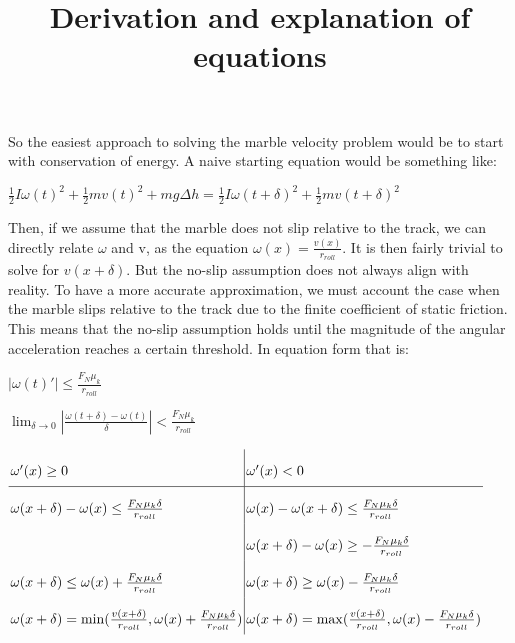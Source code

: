 \documentclass{article}
\begin{document}
\title{Derivation and explanation of equations}
\maketitle

So the easiest approach to solving the marble velocity problem would be
to start with conservation of energy. A naive starting equation would be something like:

\begin{math}
    \frac{1}{2} I \omega(t)^{2} + \frac{1}{2} m v(t)^{2} + m g \Delta h = \frac{1}{2} I \omega(t + \delta)^{2} + \frac{1}{2} m v(t + \delta)^{2}
\end{math}

Then, if we assume that the marble does not slip relative to the track, 
we can directly relate $\omega$ and v, as the equation 
$\omega(x) = \frac{v(x)}{r_{roll}}$. It is then fairly trivial to solve for $v(x + \delta)$.
But the no-slip assumption does not always align with reality. To have a more accurate
approximation, we must account the case when the marble slips relative to the track due
to the finite coefficient of static friction. This means that the no-slip assumption holds
until the magnitude of the angular acceleration reaches a certain threshold. 
In equation form that is:

\begin{math}
    |\omega(t)'| \leq \frac{F_{N} \mu_{k}}{r_{roll}}
\end{math}

\begin{math}
    \lim_{\delta \to 0} |\frac{\omega(t + \delta) - \omega(t)}{\delta}| < \frac{F_{N} \mu_{k}}{r_{roll}}
\end{math}

\begin{math}
    \arraycolsep=1.4pt \def \arraystretch{2.2}
    \begin{array}{l|l}
        \omega'(x) \ge 0 & \omega'(x) < 0 \\
        \hline
        \omega(x + \delta) - \omega(x) \leq \frac{F_{N} \mu_{k} \delta}{r_{roll}} & \omega(x) - \omega(x + \delta) \leq \frac{F_{N} \mu_{k} \delta}{r_{roll}} \\ 
        & \omega(x + \delta) - \omega(x) \ge -\frac{F_{N} \mu_{k} \delta}{r_{roll}} \\
        \omega(x + \delta) \leq \omega(x) + \frac{F_{N} \mu_{k} \delta}{r_{roll}} & \omega(x + \delta) \ge \omega(x) - \frac{F_{N} \mu_{k} \delta}{r_{roll}} \\
        \omega(x + \delta) = \min(\frac{v(x + \delta)}{r_{roll}}, \omega(x) + \frac{F_{N} \mu_{k} \delta}{r_{roll}}) &
        \omega(x + \delta) = \max(\frac{v(x + \delta)}{r_{roll}}, \omega(x) - \frac{F_{N} \mu_{k} \delta}{r_{roll}})
    \end{array}
\end{math}
\end{document}
